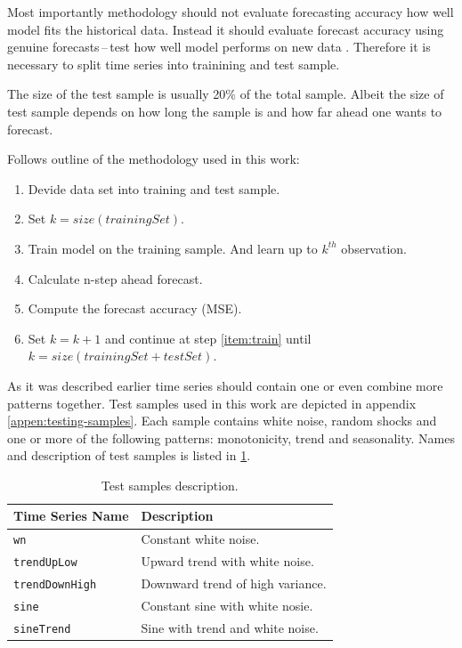     Most importantly methodology should not evaluate forecasting accuracy how well model
    fits the historical data. Instead it should evaluate forecast accuracy using genuine forecasts\,--\,test 
    how well model performs on new data \cite{otexts}. Therefore it is necessary to split time series into trainining
    and test sample.

    The size of the test sample is usually 20\% of the total sample. Albeit the size of test sample depends on how
    long the sample is and how far ahead one wants to forecast.

    Follows outline of the methodology used in this work:
    \begin{enumerate} \label{enum:methodology}
        \item Devide data set into training and test sample.
        \item Set $k = size(trainingSet)$.
        \item Train model on the training sample. And learn up to $k^{th}$ observation. \label{item:train}
        \item Calculate n-step ahead forecast.
        \item Compute the forecast accuracy (MSE).
        \item Set $k = k+1$ and continue at step \ref{item:train} until $k=size(trainingSet + testSet)$.
    \end{enumerate}

    As it was described earlier time series should contain one or even combine more patterns together. Test samples
    used in this work are depicted in appendix \ref{appen:testing-samples}. Each sample contains white noise,
    random shocks and one or more of the following patterns: monotonicity, trend and seasonality. Names and
    description of test samples is listed in \ref{tab:test-samples-description}.

    \begin{table}[h]
        \begin{center}
            \begin{tabular}{l|l}
                \textbf{Time Series Name} &  \textbf{Description} \\ \hline \hline
                \texttt{wn} & Constant white noise. \\
                \texttt{trendUpLow} & Upward trend with white noise. \\
                \texttt{trendDownHigh} & Downward trend of high variance. \\
                \texttt{sine} & Constant sine with white nosie. \\
                \texttt{sineTrend} & Sine with trend and white noise. \\
            \end{tabular}
            \caption{Test samples description.}
            \label{tab:test-samples-description}
        \end{center}
    \end{table}

